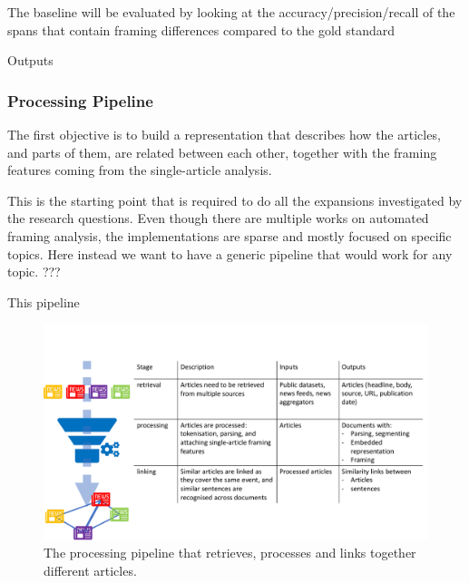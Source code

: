 The baseline will be evaluated by looking at the accuracy/precision/recall of the spans that contain framing differences compared to the gold standard

Outputs

\subsubsection{Processing Pipeline}
\label{sec:prop_pipeline}
The first objective is to build a representation that describes how the articles, and parts of them, are related between each other, together with the framing features coming from the single-article analysis.

This is the starting point that is required to do all the expansions investigated by the research questions.
Even though there are multiple works on automated framing analysis, the implementations are sparse and mostly focused on specific topics.
Here instead we want to have a generic pipeline that would work for any topic.
???

This pipeline

\begin{figure}[!htb]
    \centering
    \includegraphics[width=\textwidth]{figures/figure_pipeline.pdf}
    \caption{The processing pipeline that retrieves, processes and links together different articles.}
    \label{fig:pipeline}
\end{figure}

